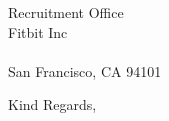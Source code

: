 \documentclass[11pt]{letter} %
\begin{document}
\begin{letter}{Recruitment Office\\
Fitbit Inc\\ \\
San Francisco, CA 94101}
\closing{Kind Regards,}




\end{letter}
\end{document}
